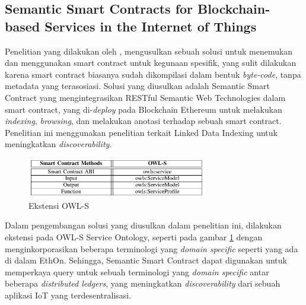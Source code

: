 \subsection{Semantic Smart Contracts for Blockchain-based Services in the Internet of Things}
\label{subsec:semantic-smart-contract-iot}

Penelitian yang dilakukan oleh \cite{baqa2019semantic}, mengusulkan sebuah solusi untuk menemukan dan menggunakan smart contract untuk kegunaan spesifik, yang sulit dilakukan karena smart contract biasanya sudah dikompilasi dalam bentuk \textit{byte-code}, tanpa metadata yang terasosiasi. Solusi yang diusulkan adalah Semantic Smart Contract yang mengintegrasikan RESTful Semantic Web Technologies dalam smart contract, yang di-\textit{deploy} pada Blockchain Ethereum untuk melakukan \textit{indexing}, \textit{browsing}, dan melakukan anotasi terhadap sebuah smart contract. Penelitian ini menggunakan penelitian \cite{third2017linked} terkait Linked Data Indexing untuk meningkatkan \textit{discoverability}.

\begin{figure}
  \centering
  \includegraphics[width=0.7\textwidth]{resources/chapter-2/ssc-ontology-extension.png}
  \caption{Ekstensi OWL-S \parencite{baqa2019semantic}}
  \label{image:ekstensi-owl-s}
\end{figure}

Dalam pengembangan solusi yang diusulkan dalam penelitian ini, dilakukan ekstensi pada OWL-S Service Ontology, seperti pada gambar \ref{image:ekstensi-owl-s} dengan menginkorporasikan beberapa terminologi yang \textit{domain specific} seperti yang ada di dalam EthOn. Sehingga, Semantic Smart Contract dapat digunakan untuk memperkaya query untuk sebuah terminologi yang \textit{domain specific} antar beberapa \textit{distributed ledgers}, yang meningkatkan \textit{discoverability} dari sebuah aplikasi IoT yang terdesentralisasi.